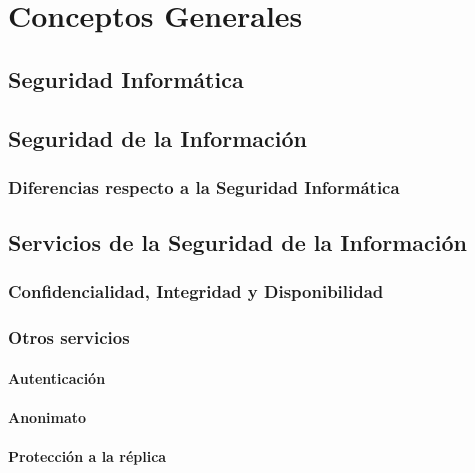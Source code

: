 \chapter{Conceptos Generales}

\section{Seguridad Informática}

\section{Seguridad de la Información}

\subsection{Diferencias respecto a la Seguridad Informática}

\section{Servicios de la Seguridad de la Información}

\subsection[CID]{Confidencialidad, Integridad y Disponibilidad}

\subsection{Otros servicios}

\subsubsection{Autenticación}

\subsubsection{Anonimato}

\subsubsection{Protección a la réplica}